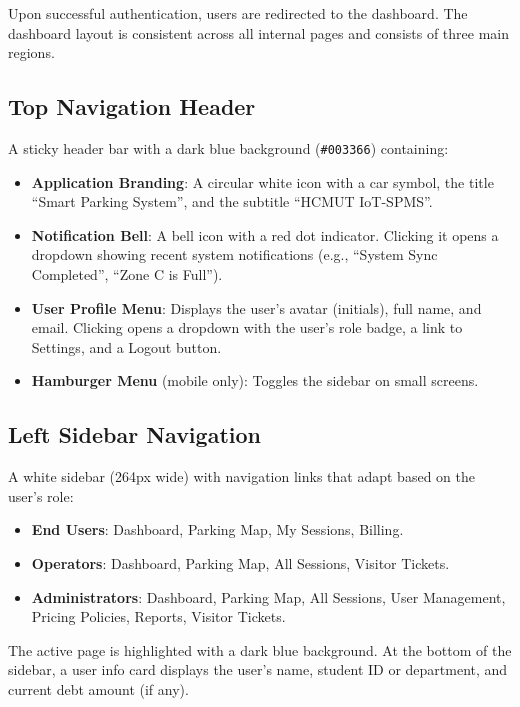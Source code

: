 \documentclass[12pt,a4paper]{article}
\begin{document}
Upon successful authentication, users are redirected to the dashboard. The dashboard layout is consistent across all internal pages and consists of three main regions.

\subsection{Top Navigation Header}

A sticky header bar with a dark blue background (\texttt{\#003366}) containing:
\begin{itemize}
    \item \textbf{Application Branding}: A circular white icon with a car symbol, the title ``Smart Parking System'', and the subtitle ``HCMUT IoT-SPMS''.
    \item \textbf{Notification Bell}: A bell icon with a red dot indicator. Clicking it opens a dropdown showing recent system notifications (e.g., ``System Sync Completed'', ``Zone C is Full'').
    \item \textbf{User Profile Menu}: Displays the user's avatar (initials), full name, and email. Clicking opens a dropdown with the user's role badge, a link to Settings, and a Logout button.
    \item \textbf{Hamburger Menu} (mobile only): Toggles the sidebar on small screens.
\end{itemize}

\subsection{Left Sidebar Navigation}

A white sidebar (264px wide) with navigation links that adapt based on the user's role:

\begin{itemize}
    \item \textbf{End Users}: Dashboard, Parking Map, My Sessions, Billing.
    \item \textbf{Operators}: Dashboard, Parking Map, All Sessions, Visitor Tickets.
    \item \textbf{Administrators}: Dashboard, Parking Map, All Sessions, User Management, Pricing Policies, Reports, Visitor Tickets.
\end{itemize}

The active page is highlighted with a dark blue background. At the bottom of the sidebar, a user info card displays the user's name, student ID or department, and current debt amount (if any).
\end{document}
